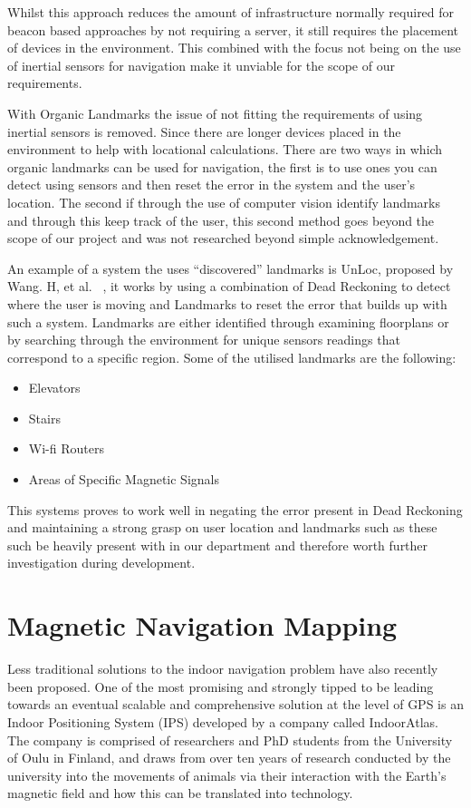 \documentclass[main.tex]{subfiles}
\begin{document}
Whilst this approach reduces the amount of infrastructure normally required for beacon based approaches by not requiring a server, it still requires the placement of devices in the environment. This combined with the focus not being on the use of inertial sensors for navigation make it unviable for the scope of our requirements.

With Organic Landmarks the issue of not fitting the requirements of using inertial sensors is removed. Since there are longer devices placed in the environment to help with locational calculations. There are two ways in which organic landmarks can be used for navigation, the first is to use ones you can detect using sensors and then reset the error in the system and the user's location. The second if through the use of computer vision identify landmarks and through this keep track of the user, this second method goes beyond the scope of our project and was not researched beyond simple acknowledgement.

An example of a system the uses ``discovered'' landmarks is UnLoc, proposed by Wang. H, et al. ~\cite{wanf2012no}, it works by using a combination of Dead Reckoning to detect where the user is moving and Landmarks to reset the error that builds up with such a system. Landmarks are either identified through examining floorplans or by searching through the environment for unique sensors readings that correspond to a specific region. Some of the utilised landmarks are the following:

\begin{itemize}
	\item Elevators
	\item Stairs
	\item Wi-fi Routers
	\item Areas of Specific Magnetic Signals
\end{itemize}

This systems proves to work well in negating the error present in Dead Reckoning and maintaining a strong grasp on user location and landmarks such as these such be heavily present with in our department and therefore worth further investigation during development.



 \section{Magnetic Navigation Mapping}
 
 Less traditional solutions to the indoor navigation problem have also recently been proposed. One of the most promising and strongly tipped to be leading towards an eventual scalable and comprehensive solution at the level of GPS is an Indoor Positioning System (IPS) developed by a company called IndoorAtlas. The company is comprised of researchers and PhD students from the University of Oulu in Finland, and draws from over ten years of research conducted by the university into the movements of animals via their interaction with the Earth's magnetic field and how this can be translated into technology.\\
 
\end{document}
